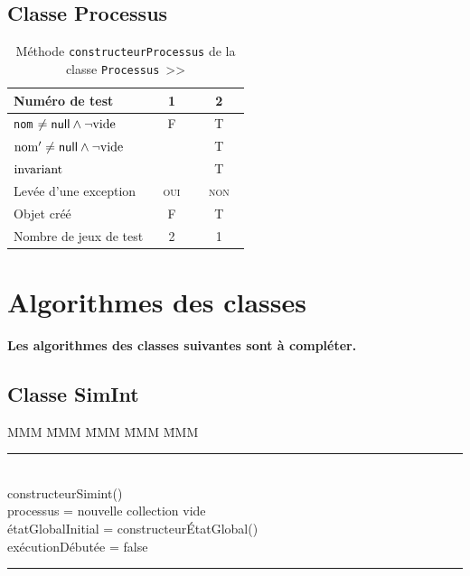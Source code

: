 \documentclass[11pt,article]{article}
\newcommand{\nullvalue}{\textsf{null}\xspace}
\newcommand{\emptyvalue}{\ensuremath\mathrm{vide}}
\newcommand{\invariant}{\ensuremath\mathrm{invariant}}
\begin{document}
\subsection{Classe \textsf{Processus}}

\begin{table}[h!]
\begin{center}
\begin{tabular}{|p{0.6\linewidth}|c|c|}
\hline
Numéro de test
&1&2\\
\hline
\hline
\texttt{nom} $\neq \nullvalue \land \neg \emptyvalue$
&F&T\\
\hline
\hline
$\nom' \neq \nullvalue \land \neg \emptyvalue$
& &T\\
\hline
$\invariant$
& &T\\
\hline
Levée d'une exception&\textsc{oui}&\textsc{non}\\
\hline
\hline
Objet créé
&F&T\\
\hline
\hline
Nombre de jeux de test 
&2&1\\
\hline
\end{tabular}
\caption{Méthode \texttt{constructeurProcessus} de la
classe \texttt{Processus}~>>}
\end{center}
\end{table}

\newpage

\renewcommand*{\thepage}{\roman{page}}

\appendix

\section{Algorithmes des classes}

{\color{red}\textbf{Les algorithmes des classes suivantes sont à compléter.}}

\subsection{Classe \textsf{SimInt}}

\begin{tabbing}
MMM \= MMM \= MMM \= MMM \= MMM \kill
\rule{12cm}{0.2mm} \\
\textsf{\large constructeurSimint()} \\
\> processus = nouvelle collection vide\\
\> étatGlobalInitial = constructeurÉtatGlobal()\\
\> exécutionDébutée = false\\
\rule{12cm}{0.2mm}
\end{tabbing}
\end{document}
